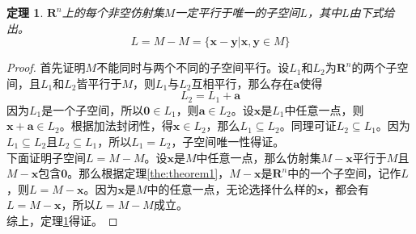 \documentclass[a4paper,11pt,oneside]{article}
\newtheorem{theorem}{定理}[section]
\newtheorem{proof}{证明}[section]
\begin{document}
			\begin{theorem}
				\label{the:theorem2}
				$\textbf{R}^{n}$上的每个非空仿射集$M$一定平行于唯一的子空间$L$，其中$L$由下式给出。
				$$L=M-M=\{\textbf{x}-\textbf{y}|\textbf{x},\textbf{y}\in M\}$$
			\end{theorem}
			\begin{proof}
				首先证明$M$不能同时与两个不同的子空间平行。设$L_{1}$和$L_{2}$为$\textbf{R}^{n}$的两个子空间，且$L_{1}$和$L_{2}$皆平行于$M$，则$L_{1}$与$L_{2}$互相平行，那么存在$\textbf{a}$使得
				$$L_{2}=L_{1}+\textbf{a}$$
				因为$L_{1}$是一个子空间，所以$\textbf{0} \in L_{1}$，则$\textbf{a} \in L_{2}$。设$\textbf{x}$是$L_{1}$中任意一点，则$\textbf{x}+\textbf{a} \in L_{2}$。根据加法封闭性，得$\textbf{x} \in L_{2}$，那么$L_{1} \subseteq L_{2}$。同理可证$L_{2} \subseteq L_{1}$。因为$L_{1} \subseteq L_{2}$且$L_{2} \subseteq L_{1}$，所以$L_{1} = L_{2}$，子空间唯一性得证。\\
				下面证明子空间$L=M-M$。设$\textbf{x}$是$M$中任意一点，那么仿射集$M-\textbf{x}$平行于$M$且$M-\textbf{x}$包含$\textbf{0}$。那么根据定理\ref{the:theorem1}，$M-\textbf{x}$是$\textbf{R}^{n}$中的一个子空间，记作$L$，则$L=M-\textbf{x}$。因为$\textbf{x}$是$M$中的任意一点，无论选择什么样的$\textbf{x}$，都会有$L=M-\textbf{x}$，所以$L=M-M$成立。\\
				综上，定理\ref{the:theorem2}得证。
			\end{proof}
		
\end{document}

